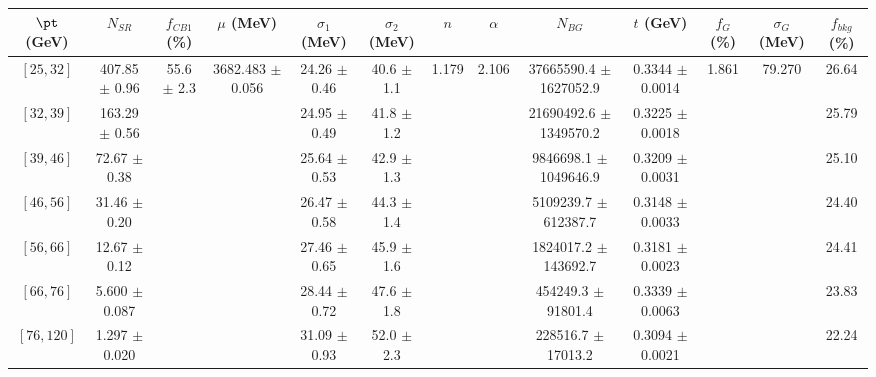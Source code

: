 \begin{tabular}{c||c|c|c|c|c|c|c|c|c|c|c||c}
$\pt$ (GeV) & $N_{SR}$ & $f_{CB1}$ (\%) & $\mu$ (MeV) & $\sigma_1$ (MeV) & $\sigma_2$ (MeV) & $n$ & $\alpha$ & $N_{BG}$ & $t$ (GeV) & $f_G$ (\%) & $\sigma_G$ (MeV) & $f_{bkg}$ (\%) \\
\hline
$[25, 32]$ & 407.85 $\pm$ 0.96 & \multirow{7}{*}{55.6 $\pm$ 2.3} & \multirow{7}{*}{3682.483 $\pm$ 0.056} & 24.26 $\pm$ 0.46 & 40.6 $\pm$ 1.1 & \multirow{7}{*}{1.179} & \multirow{7}{*}{2.106} & 37665590.4 $\pm$ 1627052.9 & 0.3344 $\pm$ 0.0014 & \multirow{7}{*}{1.861} & \multirow{7}{*}{79.270} & 26.64\\
$[32, 39]$ & 163.29 $\pm$ 0.56 &  &  & 24.95 $\pm$ 0.49 & 41.8 $\pm$ 1.2 &  &  & 21690492.6 $\pm$ 1349570.2 & 0.3225 $\pm$ 0.0018 &  &  & 25.79\\
$[39, 46]$ & 72.67 $\pm$ 0.38 &  &  & 25.64 $\pm$ 0.53 & 42.9 $\pm$ 1.3 &  &  & 9846698.1 $\pm$ 1049646.9 & 0.3209 $\pm$ 0.0031 &  &  & 25.10\\
$[46, 56]$ & 31.46 $\pm$ 0.20 &  &  & 26.47 $\pm$ 0.58 & 44.3 $\pm$ 1.4 &  &  & 5109239.7 $\pm$ 612387.7 & 0.3148 $\pm$ 0.0033 &  &  & 24.40\\
$[56, 66]$ & 12.67 $\pm$ 0.12 &  &  & 27.46 $\pm$ 0.65 & 45.9 $\pm$ 1.6 &  &  & 1824017.2 $\pm$ 143692.7 & 0.3181 $\pm$ 0.0023 &  &  & 24.41\\
$[66, 76]$ & 5.600 $\pm$ 0.087 &  &  & 28.44 $\pm$ 0.72 & 47.6 $\pm$ 1.8 &  &  & 454249.3 $\pm$ 91801.4 & 0.3339 $\pm$ 0.0063 &  &  & 23.83\\
$[76, 120]$ & 1.297 $\pm$ 0.020 &  &  & 31.09 $\pm$ 0.93 & 52.0 $\pm$ 2.3 &  &  & 228516.7 $\pm$ 17013.2 & 0.3094 $\pm$ 0.0021 &  &  & 22.24\\
\end{tabular}
